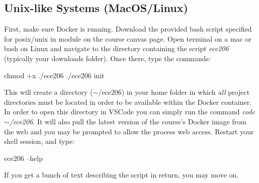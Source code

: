 \documentclass[11pt, letterpaper, titlepage, oneside]{memoir}
\begin{document}
        \subsection*{Unix-like Systems (MacOS/Linux)}
            First, make sure Docker is running. Download the provided bash script specified for posix/unix in module on the course canvas page. Open terminal on a mac or bash on Linux and navigate to the directory containing the script \textit{ece206} (typically your downloads folder). Once there, type the commands:
            \begin{bash}
                chmod +x ./ece206
                ./ece206 init
            \end{bash}
            This will create a directory ($\sim$/ece206) in your home folder in which \textit{all} project directories must be located in order to be available within the Docker container. In order to open this directory in VSCode you can simply run the command \textit{code $\sim$/ece206}. It will also pull the latest version of the course's Docker image from the web and you may be prompted to allow the process web access. Restart your shell session, and type:
            \begin{bash}
                ece206 --help
            \end{bash}
            If you get a bunch of text describing the script in return, you may move on.
\end{document}
